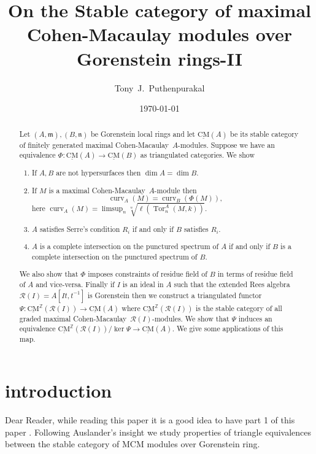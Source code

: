 \documentclass{amsart}
\newcommand{\CM}{Cohen-Macaulay}
\newcommand{\n}{\mathfrak{n} }
\newcommand{\m}{\mathfrak{m} }
\newcommand{\Z}{\mathbb{Z} }
\newcommand{\eR}{\mathcal{R} }
\newcommand{\rt}{\rightarrow}
\newcommand{\curv}{\operatorname{curv}}
\newcommand{\CMS}{\operatorname{\underline{CM}}}
\newcommand{\Tor}{\operatorname{Tor}}
\theoremstyle{plain}
\theoremstyle{definition}
\theoremstyle{remark}
\begin{document}
\title[Stable category]{On the Stable category of maximal Cohen-Macaulay modules over Gorenstein rings-II }
\author{Tony~J.~Puthenpurakal}
\date{\today}
\address{Department of Mathematics, IIT Bombay, Powai, Mumbai 400 076}


 \begin{abstract}
Let $(A,\m), (B,\n) $ be  Gorenstein local rings  and let $\CMS(A)$ be its stable category of finitely generated maximal \CM \ $A$-modules. Suppose we have an equivalence $\Phi \colon \CMS(A) \rt \CMS(B)$ as triangulated categories. We show
\begin{enumerate}
  \item If $A, B$ are not hypersurfaces then $\dim A = \dim B$.
  \item If $M$ is a maximal \CM \ $A$-module then $$\curv_A(M) = \curv_B (\Phi(M)),$$ here $\curv_A(M) = \limsup_n \sqrt[n]{\ell(\Tor^A_n(M,k))}$.
  \item $A$ satisfies Serre's condition $R_i$ if and only if $B$ satisfies $R_i$.
  \item $A$ is a complete intersection on the punctured spectrum of $A$ if and only if $B$ is a complete intersection on the punctured spectrum of $B$.
\end{enumerate}
We also show that $\Phi$ imposes constraints of residue field of $B$ in terms of residue field of $A$ and vice-versa. Finally if $I$ is an ideal in $A$ such that the extended Rees algebra $\eR(I) = A[It, t^{-1}]$ is Gorenstein then we construct a triangulated functor $\Psi \colon \CMS^\Z(\eR(I)) \rt \CMS(A)$ where $\CMS^\Z(\eR(I))$ is the stable category of all graded maximal \CM \ $\eR(I)$-modules. We show that $\Psi$ induces an equivalence $\CMS^\Z(\eR(I))/\ker \Psi \rt \CMS(A)$. We give some applications of this map.
\end{abstract}
 \maketitle
\section{introduction}
Dear Reader, while reading this paper it is a good idea to have part 1 of this paper \cite{P-stable}.
Following Auslander's insight we study properties of triangle equivalences between the stable category of MCM modules over Gorenstein ring.
\end{document}
